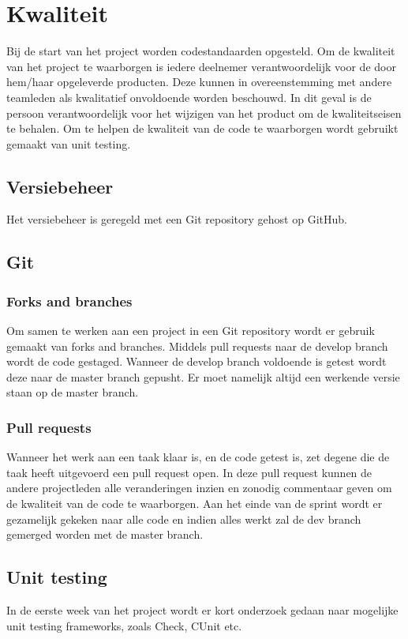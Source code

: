 \section{Kwaliteit}
Bij de start van het project worden codestandaarden opgesteld. Om de kwaliteit
van het project te waarborgen is iedere deelnemer verantwoordelijk voor de door
hem/haar opgeleverde producten. Deze kunnen in overeenstemming met andere
teamleden als kwalitatief onvoldoende worden beschouwd. In dit geval is de
persoon verantwoordelijk voor het wijzigen van het product om de
kwaliteitseisen te behalen. Om te helpen de kwaliteit van de code te waarborgen
wordt gebruikt gemaakt van unit testing.

\subsection{Versiebeheer}
\label{sec:versiebeheer}

Het versiebeheer is geregeld met een Git repository gehost op GitHub.

\subsection{Git}
\subsubsection{Forks and branches}
Om samen te werken aan een project in een Git repository wordt er gebruik
gemaakt van forks and branches. Middels pull requests naar de develop branch
wordt de code gestaged. Wanneer de develop branch voldoende is getest wordt
deze naar de master branch gepusht. Er moet namelijk altijd een werkende versie
staan op de master branch.

\subsubsection{Pull requests}
Wanneer het werk aan een taak klaar is, en de code getest is, zet degene die de
taak heeft uitgevoerd een pull request open. In deze pull request kunnen de andere
projectleden alle veranderingen inzien en zonodig commentaar geven om de kwaliteit
van de code te waarborgen.
Aan het einde van de sprint wordt er gezamelijk gekeken naar alle code
en indien alles werkt zal de dev branch gemerged worden met de master branch.

\subsection{Unit testing}
In de eerste week van het project wordt er kort onderzoek gedaan naar mogelijke
unit testing frameworks, zoals Check, CUnit etc.

